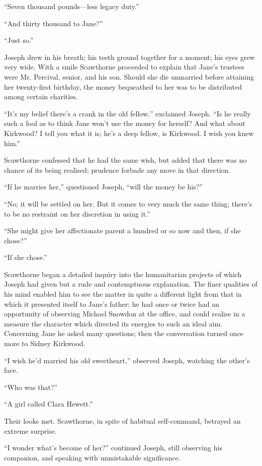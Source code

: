 ``Seven thousand pounds---less legacy duty.''

``And thirty thousand to Jane?''

``Just so.''

Joseph drew in his breath; his teeth ground together for a moment; his
eyes grew very wide. With a smile Scawthorne proceeded to explain that
Jane's trustees were Mr. Percival, senior, and his son. Should she {}die
unmarried before attaining her twenty-first birthday, the money
bequeathed to her was to be distributed among certain charities.

``It's my belief there's a crank in the old fellow,'' exclaimed Joseph.
``Is he really such a fool as to think Jane won't use the money for
herself? And what about Kirkwood? I tell you what it is; he's a deep
fellow, is Kirkwood. I wish you knew him.''

Scawthorne confessed that he had the same wish, but added that there was
no chance of its being realised; prudence forbade any move in that
direction.

``If he marries her,'' questioned Joseph, ``will the money be his?''

``No; it will be settled on her. But it comes to very much the same
thing; there's to be no restraint on her discretion in using it.''

``She might give her affectionate parent a hundred or so now and then,
if she chose?''

``If she chose.''

Scawthorne began a detailed inquiry into the humanitarian projects of
which Joseph had given but a rude and contemptuous {}explanation. The
finer qualities of his mind enabled him to see the matter in quite a
different light from that in which it presented itself to Jane's father;
he had once or twice had an opportunity of observing Michael Snowdon at
the office, and could realise in a measure the character which directed
its energies to such an ideal aim. Concerning Jane he asked many
questions; then the conversation turned once more to Sidney Kirkwood.

``I wish he'd married his old sweetheart,'' observed Joseph, watching
the other's face.

``Who was that?''

``A girl called Clara Hewett.''

Their looks met. Scawthorne, in spite of habitual self-command, betrayed
an extreme surprise.

``I wonder what's become of her?'' continued Joseph, still observing his
companion, and speaking with unmistakable significance.

